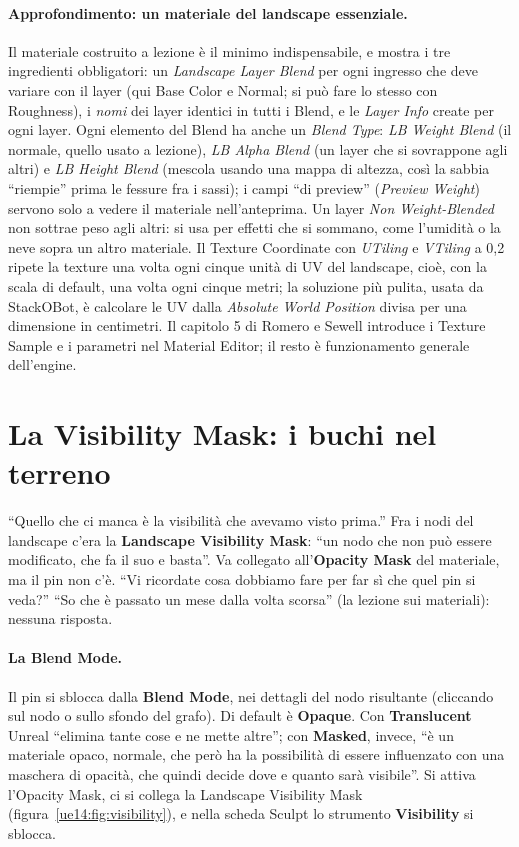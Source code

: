 \paragraph{Approfondimento: un materiale del landscape essenziale.} Il materiale costruito a
lezione è il minimo indispensabile, e mostra i tre ingredienti obbligatori: un
\emph{Landscape Layer Blend} per ogni ingresso che deve variare con il layer (qui Base
Color e Normal; si può fare lo stesso con Roughness), i \emph{nomi} dei layer identici in
tutti i Blend, e le \emph{Layer Info} create per ogni layer. Ogni elemento del Blend ha
anche un \emph{Blend Type}: \emph{LB Weight Blend} (il normale, quello usato a lezione),
\emph{LB Alpha Blend} (un layer che si sovrappone agli altri) e \emph{LB Height Blend}
(mescola usando una mappa di altezza, così la sabbia ``riempie'' prima le fessure fra i
sassi); i campi ``di preview'' (\emph{Preview Weight}) servono solo a vedere il materiale
nell'anteprima. Un layer \emph{Non Weight-Blended} non sottrae peso agli altri: si usa per
effetti che si sommano, come l'umidità o la neve sopra un altro materiale. Il Texture
Coordinate con \emph{UTiling} e \emph{VTiling} a 0,2 ripete la texture una volta ogni cinque
unità di UV del landscape, cioè, con la scala di default, una volta ogni cinque metri; la
soluzione più pulita, usata da StackOBot, è calcolare le UV dalla \emph{Absolute World
Position} divisa per una dimensione in centimetri. Il capitolo 5 di Romero e Sewell
introduce i Texture Sample e i parametri nel Material Editor; il resto è funzionamento
generale dell'engine.

\section{La Visibility Mask: i buchi nel terreno}
\label{ue14:sec:visibility}

``Quello che ci manca è la visibilità che avevamo visto prima.'' Fra i nodi del landscape
c'era la \textbf{Landscape Visibility Mask}: ``un nodo che non può essere modificato, che fa
il suo e basta''. Va collegato all'\textbf{Opacity Mask} del materiale, ma il pin non c'è.
``Vi ricordate cosa dobbiamo fare per far sì che quel pin si veda?'' ``So che è passato un mese
dalla volta scorsa'' (la lezione sui materiali): nessuna risposta.

\paragraph{La Blend Mode.} Il pin si sblocca dalla \textbf{Blend Mode}, nei dettagli del
nodo risultante (cliccando sul nodo o sullo sfondo del grafo). Di default è
\textbf{Opaque}. Con \textbf{Translucent} Unreal ``elimina tante cose e ne mette altre''; con
\textbf{Masked}, invece, ``è un materiale opaco, normale, che però ha la possibilità di essere
influenzato con una maschera di opacità, che quindi decide dove e quanto sarà visibile''.
Si attiva l'Opacity Mask, ci si collega la Landscape Visibility Mask
(figura~\ref{ue14:fig:visibility}), e nella scheda Sculpt lo strumento \textbf{Visibility}
si sblocca.

